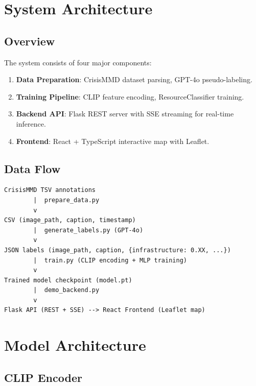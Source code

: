 \documentclass[11pt,a4paper]{article}
\begin{document}
\section{System Architecture}

\subsection{Overview}

The system consists of four major components:

\begin{enumerate}
    \item \textbf{Data Preparation}: CrisisMMD dataset parsing, GPT-4o pseudo-labeling.
    \item \textbf{Training Pipeline}: CLIP feature encoding, ResourceClassifier training.
    \item \textbf{Backend API}: Flask REST server with SSE streaming for real-time inference.
    \item \textbf{Frontend}: React + TypeScript interactive map with Leaflet.
\end{enumerate}

\subsection{Data Flow}

\begin{verbatim}
CrisisMMD TSV annotations
        |  prepare_data.py
        v
CSV (image_path, caption, timestamp)
        |  generate_labels.py (GPT-4o)
        v
JSON labels (image_path, caption, {infrastructure: 0.XX, ...})
        |  train.py (CLIP encoding + MLP training)
        v
Trained model checkpoint (model.pt)
        |  demo_backend.py
        v
Flask API (REST + SSE) --> React Frontend (Leaflet map)
\end{verbatim}

\newpage
\section{Model Architecture}

\subsection{CLIP Encoder}
\end{document}
